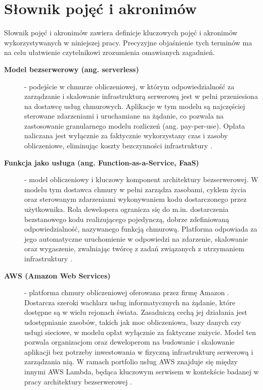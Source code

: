 \chapter*{Słownik pojęć i akronimów}

Słownik pojęć i akronimów zawiera definicje kluczowych pojęć i akronimów wykorzystywanych w niniejszej pracy. 
Precyzyjne objaśnienie tych terminów ma na celu ułatwienie czytelnikowi zrozumienia omawianych zagadnień.

\begin{description}
    \item[\textbf{Model bezserwerowy (ang. serverless)}] - podejście w chmurze obliczeniowej, w którym odpowiedzialność za zarządzanie i skalowanie infrastrukturą serwerową jest w pełni przeniesiona na dostawcę usług chmurowych. Aplikacje w tym modelu są najczęściej sterowane zdarzeniami i uruchamiane na żądanie, co pozwala na zastosowanie granularnego modelu rozliczeń (ang. pay-per-use). Opłata naliczana jest wyłącznie za faktycznie wykorzystany czas i zasoby obliczeniowe, eliminując koszty bezczynności infrastruktury \cite{SpecRgCloudGroupVisionOnThePerformanceChallengesOfFaas}\cite{ServerlessApplicationsWhyWhenAndHow}.

    \item[\textbf{Funkcja jako usługa (ang. Function-as-a-Service, FaaS)}] - model obliczeniowy i kluczowy komponent architektury bezserwerowej. W modelu tym dostawca chmury w pełni zarządza zasobami, cyklem życia oraz sterowanym zdarzeniami wykonywaniem kodu dostarczonego przez użytkownika. Rola dewelopera ogranicza się do m.in. dostarczenia bezstanowego kodu realizującego pojedynczą, dobrze zdefiniowaną odpowiedzialność, nazywanego funkcją chmurową. Platforma odpowiada za jego automatyczne uruchomienie w odpowiedzi na zdarzenie, skalowanie oraz wygaszenie, zwalniając twórcę z zadań związanych z utrzymaniem infrastruktury \cite{SpecRgCloudGroupVisionOnThePerformanceChallengesOfFaas}.

    \item[\textbf{AWS (Amazon Web Services)}] - platforma chmury obliczeniowej oferowana przez firmę Amazon \cite{aws_what_is_aws}. Dostarcza szeroki wachlarz usług informatycznych na żądanie, które dostępne są w wielu rejonach świata. Zasadniczą cechą jej działania jest udostępnianie zasobów, takich jak moc obliczeniowa, bazy danych czy usługi sieciowe, w modelu opłat wyłącznie za faktyczne zużycie. Model ten pozwala organizacjom oraz deweloperom na budowanie i skalowanie aplikacji bez potrzeby inwestowania w fizyczną infrastrukturę serwerową i zarządzania nią. W ramach portfolio usług AWS znajduje się między innymi AWS Lambda, będąca kluczowym serwisem w kontekście badanej w pracy architektury bezserwerowej \cite{aws_what_is_aws}.


\end{description}
